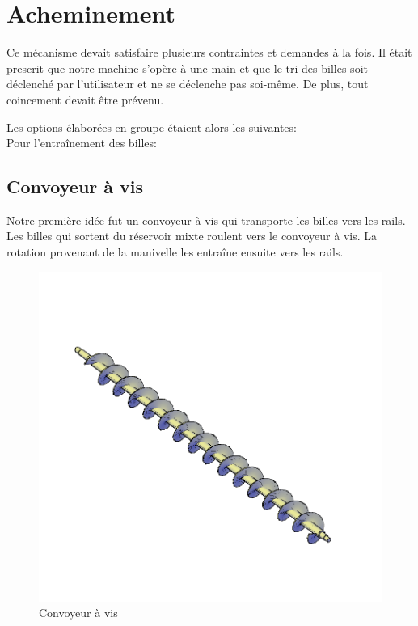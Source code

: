 \section{Acheminement}
Ce mécanisme devait satisfaire plusieurs contraintes et demandes à la fois. Il était prescrit que notre machine s'opère à une main et que le tri des billes soit déclenché par l'utilisateur et ne se déclenche pas soi-même. De plus, tout coincement devait être prévenu.

Les options élaborées en groupe étaient alors les suivantes:\\
Pour l'entraînement des billes:

\subsection{Convoyeur à vis}
Notre première idée fut un convoyeur à vis qui transporte les billes vers les rails. Les billes qui sortent du réservoir mixte roulent vers le convoyeur à vis. La rotation provenant de la manivelle les entraîne ensuite vers les rails.

\begin{figure}
    \centering
    \includegraphics[width=\textwidth]{Graphics/Images_concepts_Leon/795-Screw_conveyor.png}
    \caption{Convoyeur à vis}
\end{figure}

